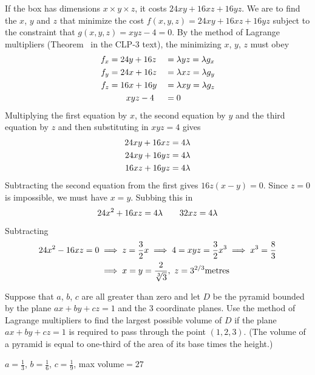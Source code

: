 \begin{solution}
If the box has dimensions $x\times y\times z$, it costs
$24xy+16xz+16yz$. We are to find the $x$, $y$ and $z$ that minimize the cost $f(x,y,z)=24xy+16xz+16yz$ subject to the constraint that $g(x,y,z)=xyz-4=0$. 
By the method of Lagrange multipliers (Theorem~ 
in the CLP-3 text), the minimizing $x$, $y$, $z$ must obey
\begin{alignat*}{3}
f_x&=24y+16z&&=\lambda yz=\lambda g_x \\
f_y&=24x+16z&&=\lambda xz=\lambda g_y \\
f_z&=16x+16y&&=\lambda xy=\lambda g_z \\
&\ \ \ \ \ \  xyz-4&&=0
\end{alignat*}
Multiplying the first equation by $x$, the second equation by $y$ 
and the third equation by $z$ and then substituting in $xyz=4$ gives
\begin{align*}
24xy+16xz&=4\lambda \\
24xy+16yz&=4\lambda \\
16xz+16yz&=4\lambda
\end{align*}
Subtracting the second equation from the first gives $16z(x-y)=0$.
Since $z=0$ is impossible, we must have $x=y$. Subbing this in
\begin{equation*}
24x^2+16xz=4\lambda\qquad 32xz=4\lambda
\end{equation*}
Subtracting
\begin{align*}
24x^2-16xz=0&\implies z=\frac{3}{2}x
\implies 4=xyz=\frac{3}{2}x^3
\implies x^3=\frac{8}{3} \\
&\implies x=y=\frac{2}{\root 3\of 3},\ z=3^{2/3}{\rm metres}
\end{align*}
\end{solution}

\begin{question}[M200 2000A] %
Suppose that $a$, $b$, $c$ are all greater than zero and let 
$D$ be the pyramid bounded by the plane $ax+by+cz=1$ and the 3 
coordinate planes. Use the method of Lagrange multipliers to find the 
largest possible volume of $D$ if the plane $ax + by + cz = 1$ is required 
to pass through the point $(1, 2, 3)$. (The volume of a pyramid is equal to one-third of the area of its base times the height.) 
\end{question}

%

\begin{answer}
$a=\frac{1}{3}$, $b=\frac{1}{6}$, $c=\frac{1}{9}$,
max volume$ = 27$
\end{answer}

